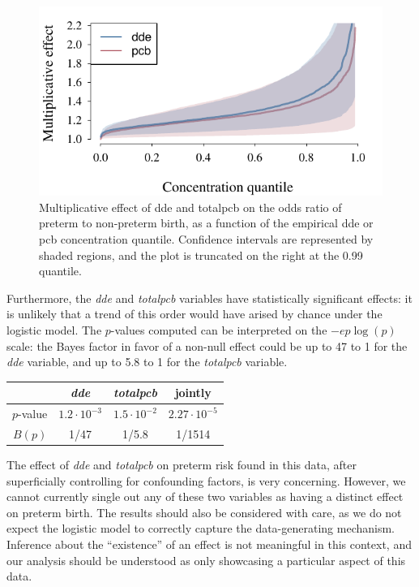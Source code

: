 \documentclass[10pt,]{article}
\begin{document}
\begin{figure}

{\centering \includegraphics{report_files/figure-latex/unnamed-chunk-3-1} 

}

\caption{Multiplicative effect of dde and totalpcb on the odds ratio of preterm to non-preterm birth, as a function of the empirical dde or pcb concentration quantile. Confidence intervals are represented by shaded regions, and the plot is truncated on the right at the 0.99 quantile.}\label{fig:unnamed-chunk-3}
\end{figure}

Furthermore, the \emph{dde} and \emph{totalpcb} variables have
statistically significant effects: it is unlikely that a trend of this
order would have arised by chance under the logistic model. The
\(p\)-values computed can be interpreted on the \(-e p \log(p)\) scale:
the Bayes factor in favor of a non-null effect could be up to 47 to 1
for the \emph{dde} variable, and up to 5.8 to 1 for the \emph{totalpcb}
variable.

\begin{longtable}[]{@{}rccc@{}}
\toprule
& \emph{dde} & \emph{totalpcb} & jointly\tabularnewline
\midrule
\endhead
\(p\)-value & \(1.2\cdot 10^{-3}\) & \(1.5 \cdot 10^{-2}\) &
\(2.27 \cdot 10^{-5}\)\tabularnewline
\(B(p)\) & 1/47 & 1/5.8 & 1/1514\tabularnewline
\bottomrule
\end{longtable}

The effect of \emph{dde} and \emph{totalpcb} on preterm risk found in
this data, after superficially controlling for confounding factors, is
very concerning. However, we cannot currently single out any of these
two variables as having a distinct effect on preterm birth. The results
should also be considered with care, as we do not expect the logistic
model to correctly capture the data-generating mechanism. Inference
about the ``existence'' of an effect is not meaningful in this context,
and our analysis should be understood as only showcasing a particular
aspect of this data.
\end{document}
